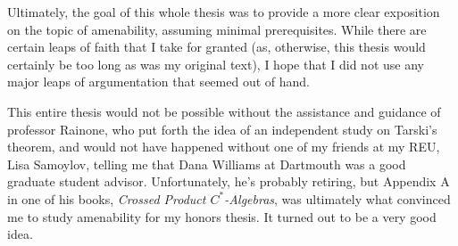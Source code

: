 \documentclass[10pt]{mypackage2}
\begin{document}
Ultimately, the goal of this whole thesis was to provide a more clear exposition on the topic of amenability, assuming minimal prerequisites. While there are certain leaps of faith that I take for granted (as, otherwise, this thesis would certainly be too long as was my original text), I hope that I did not use any major leaps of argumentation that seemed out of hand.\newline

This entire thesis would not be possible without the assistance and guidance of professor Rainone, who put forth the idea of an independent study on Tarski's theorem, and would not have happened without one of my friends at my REU, Lisa Samoylov, telling me that Dana Williams at Dartmouth was a good graduate student advisor. Unfortunately, he's probably retiring, but Appendix A in one of his books, \textit{Crossed Product $C^{\ast}$-Algebras}, was ultimately what convinced me to study amenability for my honors thesis. It turned out to be a very good idea.
\nocite{*}
\printbibliography[title={References}]
\end{document}
